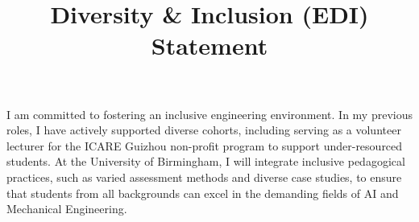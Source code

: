 \documentclass[10pt, a4paper]{article}
\title{\textbf{Diversity & Inclusion (EDI) Statement}}
\author{}
\date{}
\begin{document}
\maketitle
\vspace{-4em} %

I am committed to fostering an inclusive engineering environment. In my previous roles, I have actively supported diverse cohorts, including serving as a volunteer lecturer for the ICARE Guizhou non-profit program to support under-resourced students. At the University of Birmingham, I will integrate inclusive pedagogical practices, such as varied assessment methods and diverse case studies, to ensure that students from all backgrounds can excel in the demanding fields of AI and Mechanical Engineering.
\end{document}
